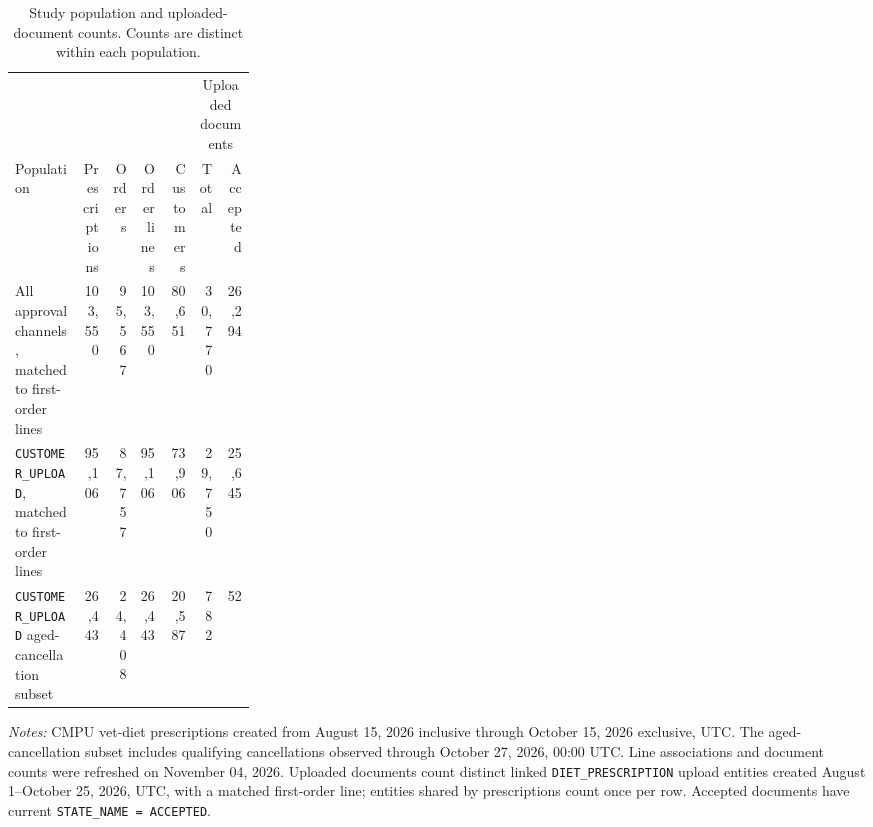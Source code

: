 \begin{table}[htbp]
\centering
\caption{Study population and uploaded-document counts. Counts are distinct within each population.}
\label{tab:study-population-counts}
\small
\begin{tabular}{@{}>{\raggedright\arraybackslash}p{0.28\linewidth}rrrrrr@{}}
\toprule
& & & & & \multicolumn{2}{c}{Uploaded documents} \\
\cmidrule(lr){6-7}
Population & Prescriptions & Orders & \shortstack[r]{Order\\lines} & Customers & Total & Accepted \\
\midrule

All approval channels, matched to first-order lines & 103,550 & 95,567 & 103,550 & 80,651 & 30,770 & 26,294 \\

\texttt{CUSTOMER\_UPLOAD}, matched to first-order lines & 95,106 & 87,757 & 95,106 & 73,906 & 29,750 & 25,645 \\

\texttt{CUSTOMER\_UPLOAD} aged-cancellation subset & 26,443 & 24,408 & 26,443 & 20,587 & 782 & 52 \\
\bottomrule
\end{tabular}

\begin{minipage}{\linewidth}
\footnotesize
\textit{Notes:} CMPU vet-diet prescriptions created from August 15, 2026 inclusive
through October 15, 2026 exclusive, UTC. The aged-cancellation subset includes
qualifying cancellations observed through October 27, 2026, 00:00 UTC.
Line associations and document counts were refreshed on November 04, 2026.
Uploaded documents count distinct linked \texttt{DIET\_PRESCRIPTION} upload entities
created August 1--October 25, 2026, UTC, with a matched first-order line; entities
shared by prescriptions count once per row. Accepted documents have current
\texttt{STATE\_NAME = ACCEPTED}.
\end{minipage}
\end{table}